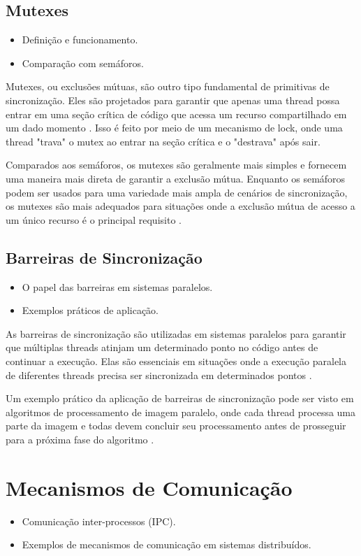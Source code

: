 \documentclass[conference]{IEEEtran}
\begin{document}
\subsection{Mutexes}
\begin{itemize}
    \item Definição e funcionamento.
    \item Comparação com semáforos.
\end{itemize}
Mutexes, ou exclusões mútuas, são outro tipo fundamental de primitivas de sincronização. Eles são projetados para garantir que apenas uma thread possa entrar em uma seção crítica de código que acessa um recurso compartilhado em um dado momento \cite{silberschatz2009operating}. Isso é feito por meio de um mecanismo de lock, onde uma thread "trava" o mutex ao entrar na seção crítica e o "destrava" após sair.

Comparados aos semáforos, os mutexes são geralmente mais simples e fornecem uma maneira mais direta de garantir a exclusão mútua. Enquanto os semáforos podem ser usados para uma variedade mais ampla de cenários de sincronização, os mutexes são mais adequados para situações onde a exclusão mútua de acesso a um único recurso é o principal requisito \cite{herlihy2011art}.

\subsection{Barreiras de Sincronização}
\begin{itemize}
    \item O papel das barreiras em sistemas paralelos.
    \item Exemplos práticos de aplicação.
\end{itemize}

As barreiras de sincronização são utilizadas em sistemas paralelos para garantir que múltiplas threads atinjam um determinado ponto no código antes de continuar a execução. Elas são essenciais em situações onde a execução paralela de diferentes threads precisa ser sincronizada em determinados pontos \cite{grama2003introduction}.

Um exemplo prático da aplicação de barreiras de sincronização pode ser visto em algoritmos de processamento de imagem paralelo, onde cada thread processa uma parte da imagem e todas devem concluir seu processamento antes de prosseguir para a próxima fase do algoritmo \cite{mccool2012structured}.

\section{Mecanismos de Comunicação}
\begin{itemize}
    \item Comunicação inter-processos (IPC).
    \item Exemplos de mecanismos de comunicação em sistemas distribuídos.
\end{itemize}
\end{document}
